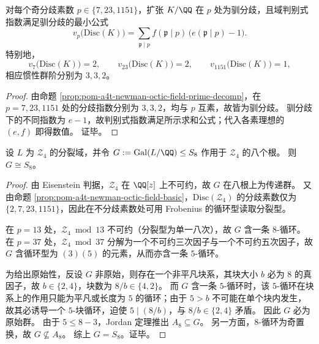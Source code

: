 \begin{corollary}[奇分歧素数处的纯驯分歧与判别式指数]\label{cor:pom-a4t-newman-octic-field-tame}
对每个奇分歧素数 \(p\in\{7,23,1151\}\)，扩张 \(K/\QQ\) 在 \(p\) 处为驯分歧，且域判别式指数满足驯分歧的最小公式
\[
v_p\!\bigl(\mathrm{Disc}(K)\bigr)=\sum_{\mathfrak p\mid p} f(\mathfrak p\mid p)\,\bigl(e(\mathfrak p\mid p)-1\bigr).
\]
特别地，
\[
v_7\!\bigl(\mathrm{Disc}(K)\bigr)=2,\qquad v_{23}\!\bigl(\mathrm{Disc}(K)\bigr)=2,\qquad v_{1151}\!\bigl(\mathrm{Disc}(K)\bigr)=1,
\]
相应惯性群阶分别为 \(3,3,2\)。
\end{corollary}
\begin{proof}
由命题 \ref{prop:pom-a4t-newman-octic-field-prime-decomp}，在 \(p=7,23,1151\) 处的分歧指数分别为 \(3,3,2\)，均与 \(p\) 互素，故皆为驯分歧。
驯分歧下的不同指数为 \(e-1\)，故判别式指数满足所示求和公式；代入各素理想的 \((e,f)\) 即得数值。
证毕。
\end{proof}

\begin{proposition}\label{prop:pom-a4t-newman-octic-field-galois-s8}
设 \(L\) 为 \(\mathcal Z_4\) 的分裂域，并令 \(G:=\mathrm{Gal}(L/\QQ)\le S_8\) 作用于 \(\mathcal Z_4\) 的八个根。
则 \(G\cong S_8\)。
\end{proposition}
\begin{proof}
由 Eisenstein 判据，\(\mathcal Z_4\) 在 \(\QQ[z]\) 上不可约，故 \(G\) 在八根上为传递群。
又由命题 \ref{prop:pom-a4t-newman-octic-field-basic}，\(\mathrm{Disc}(\mathcal Z_4)\) 的分歧素数仅为 \(\{2,7,23,1151\}\)，因此在不分歧素数处可用 Frobenius 的循环型读取分裂型。
\par
在 \(p=13\) 处，\(\mathcal Z_4\bmod 13\) 不可约（分裂型为单一八次），故 \(G\) 含一条 \(8\)-循环。
在 \(p=37\) 处，\(\mathcal Z_4\bmod 37\) 分解为一个不可约三次因子与一个不可约五次因子，故 \(G\) 含循环型为 \((3)(5)\) 的元素，从而亦含一条 \(5\)-循环。
\par
为给出原始性，反设 \(G\) 非原始，则存在一个非平凡块系，其块大小 \(b\) 必为 \(8\) 的真因子，故 \(b\in\{2,4\}\)，块数为 \(8/b\in\{4,2\}\)。
而 \(G\) 含一条 \(5\)-循环时，该 \(5\)-循环在块系上的作用只能为平凡或长度为 \(5\) 的循环；由于 \(5>b\) 不可能在单个块内发生，故其必诱导一个 \(5\)-块循环，迫使 \(5\mid (8/b)\)，与 \(8/b\in\{2,4\}\) 矛盾。
因此 \(G\) 必为原始群。
由于 \(5\le 8-3\)，Jordan 定理推出 \(A_8\subseteq G\)。
另一方面，\(8\)-循环为奇置换，故 \(G\not\subseteq A_8\)。
综上 \(G=S_8\)。证毕。
\end{proof}

